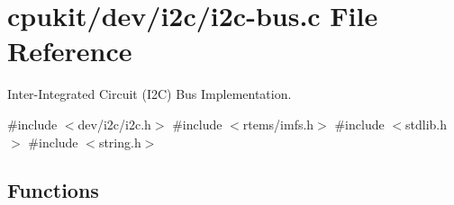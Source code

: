 \hypertarget{i2c-bus_8c}{}\section{cpukit/dev/i2c/i2c-\/bus.c File Reference}
\label{i2c-bus_8c}


Inter-\/\+Integrated Circuit (I2C) Bus Implementation.  


{\ttfamily \#include $<$dev/i2c/i2c.\+h$>$}\newline
{\ttfamily \#include $<$rtems/imfs.\+h$>$}\newline
{\ttfamily \#include $<$stdlib.\+h$>$}\newline
{\ttfamily \#include $<$string.\+h$>$}\newline
\subsection*{Functions}
